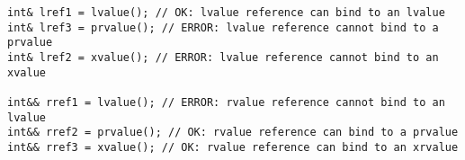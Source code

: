 \begin{lstlisting}[style=styleCXX]
int& lref1 = lvalue(); // OK: lvalue reference can bind to an lvalue
int& lref3 = prvalue(); // ERROR: lvalue reference cannot bind to a prvalue
int& lref2 = xvalue(); // ERROR: lvalue reference cannot bind to an xvalue

int&& rref1 = lvalue(); // ERROR: rvalue reference cannot bind to an lvalue
int&& rref2 = prvalue(); // OK: rvalue reference can bind to a prvalue
int&& rref3 = xvalue(); // OK: rvalue reference can bind to an xrvalue
\end{lstlisting}
















